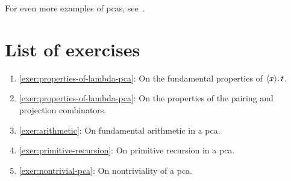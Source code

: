 For even more examples of pcas,
see~\cite[Section~1.4]{vanOosten2008}.

\section{List of exercises}
\begin{enumerate}
\item \cref{exer:properties-of-lambda-pca}: On the fundamental properties of
  \(\langle{{x}}\rangle.\,{t}\).
\item \cref{exer:properties-of-lambda-pca}: On the properties of the pairing and
  projection combinators.
\item \cref{exer:arithmetic}: On fundamental arithmetic in a pca.
\item \cref{exer:primitive-recursion}: On primitive recursion in a pca.
\item \cref{exer:nontrivial-pca}: On nontriviality of a pca.
\end{enumerate}




